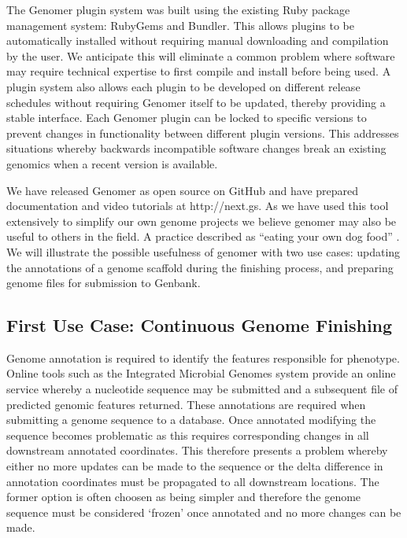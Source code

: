 \documentclass[10pt]{article}
\begin{document}
The Genomer plugin system was built using the existing Ruby package management
system: RubyGems and Bundler. This allows plugins to be automatically installed
without requiring manual downloading and compilation by the user. We anticipate
this will eliminate a common problem where software may require technical
expertise to first compile and install before being used. A plugin system also
allows each plugin to be developed on different release schedules without
requiring Genomer itself to be updated, thereby providing a stable interface.
Each Genomer plugin can be locked to specific versions to prevent changes in
functionality between different plugin versions. This addresses situations
whereby backwards incompatible software changes break an existing genomics when
a recent version is available.

We have released Genomer as open source on GitHub \cite{genomer-github} and
have prepared documentation and video tutorials at http://next.gs. As we have
used this tool extensively to simplify our own genome projects we believe
genomer may also be useful to others in the field. A practice described as
``eating your own dog food'' \cite{harrison2006}. We will illustrate the
possible usefulness of genomer with two use cases: updating the annotations of
a genome scaffold during the finishing process, and preparing genome files for
submission to Genbank.

\subsection*{First Use Case: Continuous Genome Finishing}

Genome annotation is required to identify the features responsible for
phenotype. Online tools such as the Integrated Microbial Genomes system
\cite{markowitz2006} provide an online service whereby a nucleotide sequence
may be submitted and a subsequent file of predicted genomic features returned.
These annotations are required when submitting a genome sequence to a database.
Once annotated modifying the sequence becomes problematic as this requires
corresponding changes in all downstream annotated coordinates. This therefore
presents a problem whereby either no more updates can be made to the sequence
or the delta difference in annotation coordinates must be propagated to all
downstream locations. The former option is often choosen as being simpler and
therefore the genome sequence must be considered `frozen' once annotated and no
more changes can be made.
\end{document}
